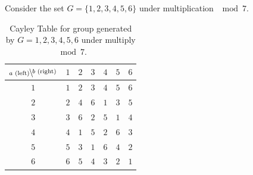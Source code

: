 \begin{example}
Consider the set $G=\{1,2,3,4,5,6\}$ under multiplication $\mod 7$.
\begin{table}[h!]
    \centering
    \begin{tabular}{c||c|c|c|c|c|c|}
         $\bsfrac{b\text{ (right)}}{a\text{ (left)}}$& $1$&$2$&$3$&$4$&$5$&$6$  \\ \hline \hline
         $1$&$1$&$2$&$3$&$4$&$5$&$6$  \\ \hline
         $2$&$2$&$4$&$6$&$1$&$3$& $5$\\ \hline
         $3$&$3$&$6$&$2$&$5$ &$1$ &$4$  \\ \hline
         $4$&$4$&$1$&$5$ &$2$ &$6$ &$3$ \\ \hline
         $5$&$5$&$3$ &$1$ &$6$ &$4$ &$2$   \\ \hline
         $6$&$6$&$5$ &$4$ &$3$ &$2$ &$1$   \\ \hline
    \end{tabular}
    \caption{Cayley Table for group generated by $G={1,2,3,4,5,6}$ under multiply $\mod 7$.}
    \label{tab:Cayley_G_7}
\end{table}


\end{example}
